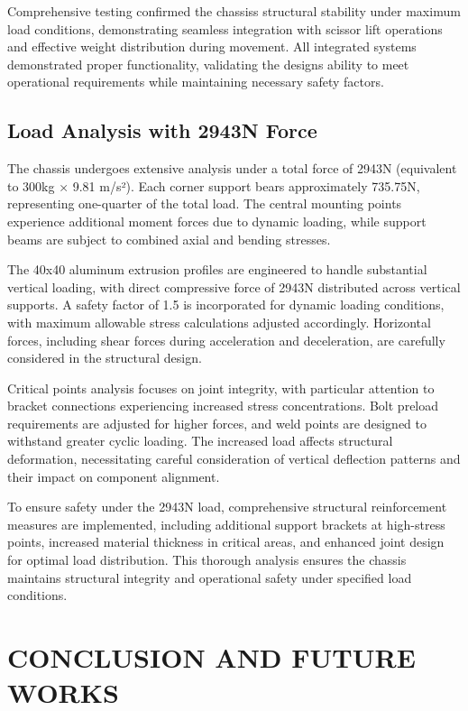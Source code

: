 \documentclass[../../main]{subfiles}
\begin{document}
Comprehensive testing confirmed the chassis\textquotesingle s structural
stability under maximum load conditions, demonstrating seamless
integration with scissor lift operations and effective weight
distribution during movement. All integrated systems demonstrated proper
functionality, validating the design\textquotesingle s ability to meet
operational requirements while maintaining necessary safety factors.

\subsection{Load Analysis with 2943N
Force}\label{load-analysis-with-2943n-force}

The chassis undergoes extensive analysis under a total force of 2943N
(equivalent to 300kg × 9.81 m/s²). Each corner support bears
approximately 735.75N, representing one-quarter of the total load. The
central mounting points experience additional moment forces due to
dynamic loading, while support beams are subject to combined axial and
bending stresses.

The 40x40 aluminum extrusion profiles are engineered to handle
substantial vertical loading, with direct compressive force of 2943N
distributed across vertical supports. A safety factor of 1.5 is
incorporated for dynamic loading conditions, with maximum allowable
stress calculations adjusted accordingly. Horizontal forces, including
shear forces during acceleration and deceleration, are carefully
considered in the structural design.

Critical points analysis focuses on joint integrity, with particular
attention to bracket connections experiencing increased stress
concentrations. Bolt preload requirements are adjusted for higher
forces, and weld points are designed to withstand greater cyclic
loading. The increased load affects structural deformation,
necessitating careful consideration of vertical deflection patterns and
their impact on component alignment.

To ensure safety under the 2943N load, comprehensive structural
reinforcement measures are implemented, including additional support
brackets at high-stress points, increased material thickness in critical
areas, and enhanced joint design for optimal load distribution. This
thorough analysis ensures the chassis maintains structural integrity and
operational safety under specified load conditions.

\section{\texorpdfstring{\textbf{CONCLUSION AND FUTURE
WORKS}}{CONCLUSION AND FUTURE WORKS}}\label{conclusion-and-future-works}
\end{document}
